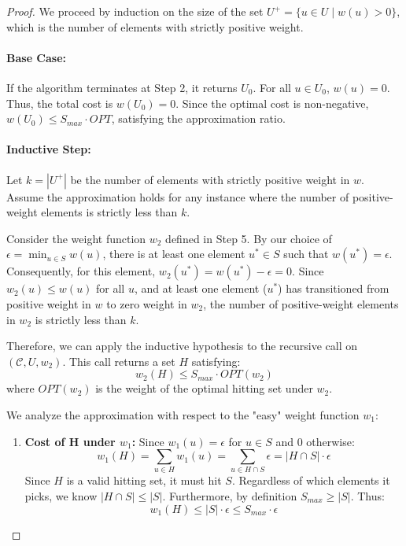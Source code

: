 \begin{proof}
We proceed by induction on the size of the set $U^+ = \{u \in U \mid w(u) > 0\}$, which is the number of elements with strictly positive weight.

\paragraph{Base Case:}
If the algorithm terminates at Step 2, it returns $U_0$. For all $u \in U_0$, $w(u) = 0$. Thus, the total cost is $w(U_0) = 0$. Since the optimal cost is non-negative, $w(U_0) \le S_{max} \cdot OPT$, satisfying the approximation ratio.

\paragraph{Inductive Step:}
Let $k = |U^+|$ be the number of elements with strictly positive weight in $w$. Assume the approximation holds for any instance where the number of positive-weight elements is strictly less than $k$.

Consider the weight function $w_2$ defined in Step 5. By our choice of $\epsilon = \min_{u \in S} w(u)$, there is at least one element $u^* \in S$ such that $w(u^*) = \epsilon$. Consequently, for this element, $w_2(u^*) = w(u^*) - \epsilon = 0$.
Since $w_2(u) \le w(u)$ for all $u$, and at least one element ($u^*$) has transitioned from positive weight in $w$ to zero weight in $w_2$, the number of positive-weight elements in $w_2$ is strictly less than $k$.

Therefore, we can apply the inductive hypothesis to the recursive call on $(\mathcal{C}, U, w_2)$. This call returns a set $H$ satisfying:
\begin{equation} \label{eq:induct}
    w_2(H) \le S_{max} \cdot OPT(w_2)
\end{equation}
where $OPT(w_2)$ is the weight of the optimal hitting set under $w_2$.

We analyze the approximation with respect to the "easy" weight function $w_1$:
\begin{enumerate}
    \item \textbf{Cost of H under $w_1$:}
    Since $w_1(u) = \epsilon$ for $u \in S$ and 0 otherwise:
    \[ w_1(H) = \sum_{u \in H} w_1(u) = \sum_{u \in H \cap S} \epsilon = |H \cap S| \cdot \epsilon \]
    Since $H$ is a valid hitting set, it must hit $S$. Regardless of which elements it picks, we know $|H \cap S| \le |S|$. Furthermore, by definition $S_{max} \ge |S|$. Thus:
    \[ w_1(H) \le |S| \cdot \epsilon \le S_{max} \cdot \epsilon \]
    

\end{enumerate}
\end{proof}
